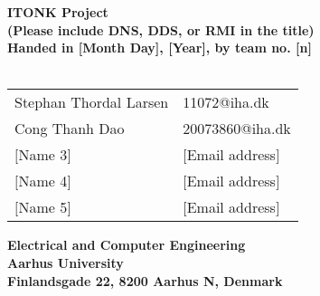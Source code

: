 \begin{titlepage}
\begin{center}
{\LARGE \textbf{ITONK Project}}\\
{\large \textbf{(Please include DNS, DDS, or RMI in the title)}}\\
\textbf{Handed in [Month Day], [Year], by team no. [n]}\\~\\
\begin{tabular}{ll}
Stephan Thordal Larsen  & 11072@iha.dk \\
Cong Thanh Dao & 20073860@iha.dk \\
$[$Name 3$]$  & $[$Email address$]$ \\
$[$Name 4$]$  & $[$Email address$]$ \\
$[$Name 5$]$  & $[$Email address$]$ \\
\end{tabular}
\vfill
\textbf{Electrical and Computer Engineering}\\
\textbf{Aarhus University}\\
\textbf{Finlandsgade 22, 8200 Aarhus N, Denmark}
\end{center}
\end{titlepage}